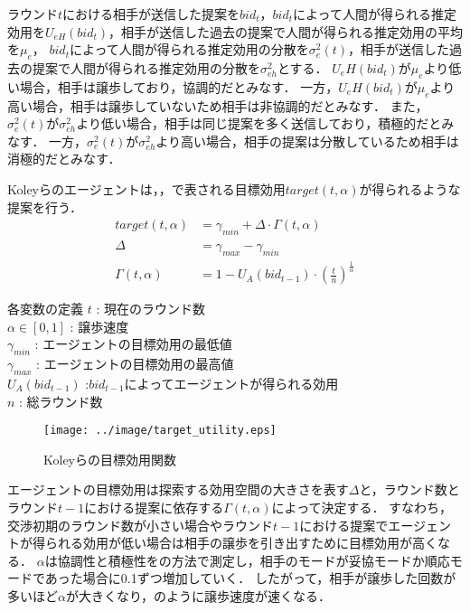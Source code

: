 ラウンド$t$における相手が送信した提案を$bid_t$，$bid_t$によって人間が得られる推定効用を$U_{eH}(bid_t)$，相手が送信した過去の提案で人間が得られる推定効用の平均を$\mu_e$，
$bid_t$によって人間が得られる推定効用の分散を$\sigma^2_e(t)$，相手が送信した過去の提案で人間が得られる推定効用の分散を$\sigma^2_{eh}$とする．
$U_eH(bid_t)$が$\mu_e$より低い場合，相手は譲歩しており，協調的だとみなす．
一方，$U_eH(bid_t)$が$\mu_e$より高い場合，相手は譲歩していないため相手は非協調的だとみなす．
また，$\sigma^2_e(t)$が$\sigma^2_{eh}$より低い場合，相手は同じ提案を多く送信しており，積極的だとみなす．
一方，$\sigma^2_e(t)$が$\sigma^2_{eh}$より高い場合，相手の提案は分散しているため相手は消極的だとみなす．

Koleyらのエージェントは，，で表される目標効用$target(t,\alpha)$が得られるような提案を行う．
\begin{align}
    target(t,\alpha) &= \gamma_{min} + \Delta \cdot \Gamma(t,\alpha)  \label{eq:target}\\
    \Delta &= \gamma_{max} - \gamma_{min} \label{eq:delta} \\
    \Gamma(t,\alpha) &= 1 - U_A(bid_{t - 1}) \cdot \left( \frac{t}{n} \right)^{\frac{1}{\alpha}} \label{eq:gamma}
\end{align}

\begin{itembox}[l]{各変数の定義}
    $t$ : 現在のラウンド数 \\
    $\alpha \in [0,1]$ : 譲歩速度 \\
    $\gamma_{min}$ : エージェントの目標効用の最低値 \\
    $\gamma_{max}$ : エージェントの目標効用の最高値 \\
    $U_A(bid_{t - 1})$ :$bid_{t - 1}$によってエージェントが得られる効用 \\
    $n$ : 総ラウンド数
\end{itembox}

\begin{figure}[tb]
    \centering
    \texttt{[image: ../image/target\_utility.eps]}
    \caption[Koleyらの目標効用関数]{Koleyらの目標効用関数 \protect \footnotemark}
    \label{fig:koley_utility}
\end{figure}

エージェントの目標効用は探索する効用空間の大きさを表す$\Delta$と，ラウンド数とラウンド$t - 1$における提案に依存する$\Gamma(t,\alpha)$によって決定する．
すなわち，交渉初期のラウンド数が小さい場合やラウンド$t - 1$における提案でエージェントが得られる効用が低い場合は相手の譲歩を引き出すために目標効用が高くなる．
$\alpha$は協調性と積極性をの方法で測定し，相手のモードが妥協モードか順応モードであった場合に0.1ずつ増加していく．
したがって，相手が譲歩した回数が多いほど$\alpha$が大きくなり，のように譲歩速度が速くなる．

